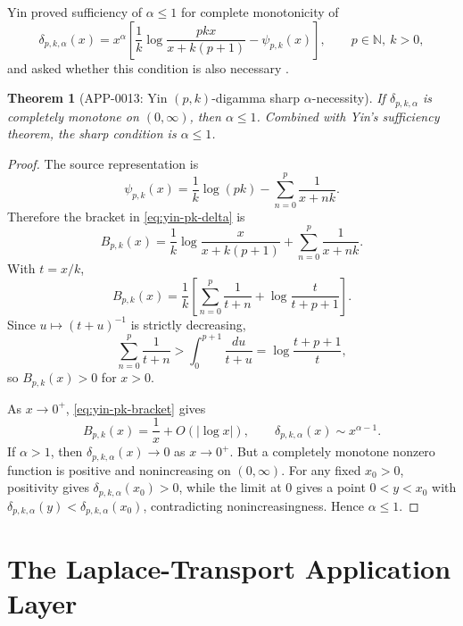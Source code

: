 \documentclass[11pt]{article}
\numberwithin{equation}{section}
\newtheorem{theorem}{Theorem}[section]
\theoremstyle{definition}
\theoremstyle{remark}
\newcommand{\1}{\mathbf 1}
\begin{document}
Yin proved sufficiency of \(\alpha\le1\) for complete monotonicity of
\begin{equation}
\label{eq:yin-pk-delta}
\delta_{p,k,\alpha}(x)
=x^\alpha\left[
\frac1k\log\frac{pkx}{x+k(p+1)}-\psi_{p,k}(x)
\right],
\qquad p\in\mathbb N,\ k>0,
\end{equation}
and asked whether this condition is also necessary \cite{yin-pk-digamma}.

\begin{theorem}[APP-0013: Yin \((p,k)\)-digamma sharp \(\alpha\)-necessity]
\label{thm:yin-pk-alpha-necessity}
If \(\delta_{p,k,\alpha}\) is completely monotone on \((0,\infty)\), then \(\alpha\le1\).  Combined with Yin's sufficiency theorem, the sharp condition is \(\alpha\le1\).
\end{theorem}

\begin{proof}
The source representation is
\begin{equation}
\label{eq:yin-pk-digamma-formula}
\psi_{p,k}(x)=\frac1k\log(pk)-\sum_{n=0}^p\frac1{x+nk}.
\end{equation}
Therefore the bracket in \eqref{eq:yin-pk-delta} is
\begin{equation}
\label{eq:yin-pk-bracket}
B_{p,k}(x)=
\frac1k\log\frac{x}{x+k(p+1)}
+\sum_{n=0}^p\frac1{x+nk}.
\end{equation}
With \(t=x/k\),
\[
B_{p,k}(x)=\frac1k\left[
\sum_{n=0}^p\frac1{t+n}
+\log\frac{t}{t+p+1}
\right].
\]
Since \(u\mapsto(t+u)^{-1}\) is strictly decreasing,
\[
\sum_{n=0}^p\frac1{t+n}
>
\int_0^{p+1}\frac{du}{t+u}
=\log\frac{t+p+1}{t},
\]
so \(B_{p,k}(x)>0\) for \(x>0\).

As \(x\to0^+\), \eqref{eq:yin-pk-bracket} gives
\begin{equation}
\label{eq:yin-pk-near-zero}
B_{p,k}(x)=\frac1x+O(|\log x|),
\qquad
\delta_{p,k,\alpha}(x)\sim x^{\alpha-1}.
\end{equation}
If \(\alpha>1\), then \(\delta_{p,k,\alpha}(x)\to0\) as \(x\to0^+\).  But a completely monotone nonzero function is positive and nonincreasing on \((0,\infty)\).  For any fixed \(x_0>0\), positivity gives \(\delta_{p,k,\alpha}(x_0)>0\), while the limit at \(0\) gives a point \(0<y<x_0\) with \(\delta_{p,k,\alpha}(y)<\delta_{p,k,\alpha}(x_0)\), contradicting nonincreasingness.  Hence \(\alpha\le1\).
\end{proof}


\section{The Laplace-Transport Application Layer}
\label{sec:transport-layer}
\end{document}
